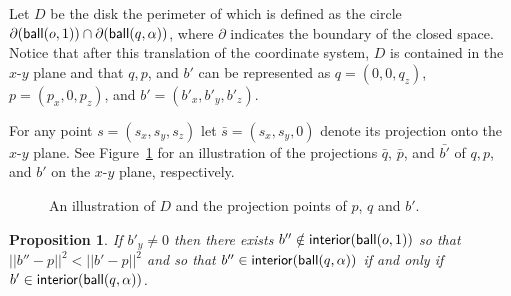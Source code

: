 \documentclass[11pt]{article}
\newtheorem{proposition}{Proposition}[section]
\newcommand{\ball}{{\sf ball}}
\newcommand{\interior}{{\sf interior}}
\begin{document}
Let $D$ be the disk the perimeter of which is defined as the circle $\partial(\ball(o,1)) \cap \partial(\ball(q, \alpha))$, where $\partial$ indicates the boundary of the closed space. Notice that after this translation of the coordinate system, $D$ is contained in the $x$-$y$ plane and that  $q,p$, and $b'$ can be represented as $q = (0,0, q_z)$, $p =(p_x,0,p_z)$, and $b' =(b'_x , b'_y  , b'_z )$.

For any point $s=(s_x,s_y,s_z)$ let $\bar{s}=(s_x,s_y,0)$ denote its projection onto the $x$-$y$ plane. See Figure~\ref{fig:plane} for an illustration of the projections $\bar{q}$, $\bar{p}$, and $\bar{b'}$ of $q,p$, and $b'$ on the $x$-$y$ plane, respectively.

\begin{figure} [ht]
    
    \centering
    \tikzVIII
    \caption{\footnotesize {An illustration of $D$ and the projection points of $p$, $q$ and $b'$.}}
    \label{fig:plane}
\end{figure}
\begin{proposition} \label{cl:rotation}
    If $b'_y \neq 0$ then there exists $b'' \notin \interior(\ball (o,1))$ so that $||b''-p||^2 < ||b' - p||^2$ and so that $b''\in \interior(\ball (q, \alpha))$ if and only if $b'\in\interior(\ball (q, \alpha))$.
\end{proposition}
\end{document}

